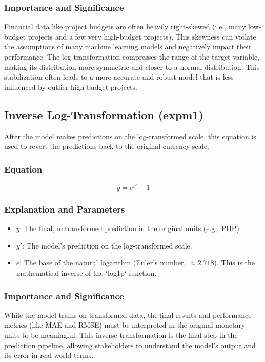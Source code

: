 \documentclass[12pt, a4paper]{article}
\begin{document}
\subsubsection{Importance and Significance}
Financial data like project budgets are often heavily right-skewed (i.e., many low-budget projects and a few very high-budget projects). This skewness can violate the assumptions of many machine learning models and negatively impact their performance. The log-transformation compresses the range of the target variable, making its distribution more symmetric and closer to a normal distribution. This stabilization often leads to a more accurate and robust model that is less influenced by outlier high-budget projects.

\subsection{Inverse Log-Transformation (expm1)}
After the model makes predictions on the log-transformed scale, this equation is used to revert the predictions back to the original currency scale.

\subsubsection{Equation}
\begin{equation}
y = e^{y'} - 1
\label{eq:expm1}
\end{equation}

\subsubsection{Explanation and Parameters}
\begin{itemize}
    \item \textbf{$y$}: The final, untransformed prediction in the original units (e.g., PHP).
    \item \textbf{$y'$}: The model's prediction on the log-transformed scale.
    \item \textbf{$e$}: The base of the natural logarithm (Euler's number, $\approx 2.718$). This is the mathematical inverse of the `log1p` function.
\end{itemize}

\subsubsection{Importance and Significance}
While the model trains on transformed data, the final results and performance metrics (like MAE and RMSE) must be interpreted in the original monetary units to be meaningful. This inverse transformation is the final step in the prediction pipeline, allowing stakeholders to understand the model's output and its error in real-world terms.
\end{document}
